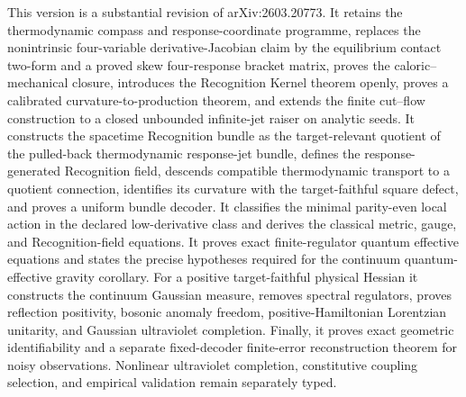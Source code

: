 This version is a substantial revision of arXiv:2603.20773.  It retains the thermodynamic compass and response-coordinate programme, replaces the nonintrinsic four-variable derivative-Jacobian claim by the equilibrium contact two-form and a proved skew four-response bracket matrix, proves the caloric--mechanical closure, introduces the Recognition Kernel theorem openly, proves a calibrated curvature-to-production theorem, and extends the finite cut--flow construction to a closed unbounded infinite-jet raiser on analytic seeds.  It constructs the spacetime Recognition bundle as the target-relevant quotient of the pulled-back thermodynamic response-jet bundle, defines the response-generated Recognition field, descends compatible thermodynamic transport to a quotient connection, identifies its curvature with the target-faithful square defect, and proves a uniform bundle decoder.  It classifies the minimal parity-even local action in the declared low-derivative class and derives the classical metric, gauge, and Recognition-field equations.  It proves exact finite-regulator quantum effective equations and states the precise hypotheses required for the continuum quantum-effective gravity corollary.  For a positive target-faithful physical Hessian it constructs the continuum Gaussian measure, removes spectral regulators, proves reflection positivity, bosonic anomaly freedom, positive-Hamiltonian Lorentzian unitarity, and Gaussian ultraviolet completion.  Finally, it proves exact geometric identifiability and a separate fixed-decoder finite-error reconstruction theorem for noisy observations.  Nonlinear ultraviolet completion, constitutive coupling selection, and empirical validation remain separately typed.
